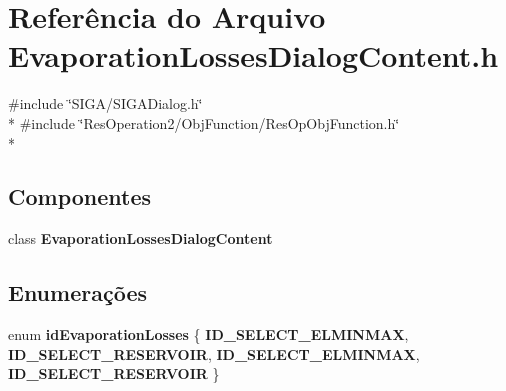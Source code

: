 \section{Referência do Arquivo Evaporation\+Losses\+Dialog\+Content.\+h}
\label{_2_obj_function_2_evaporation_losses_2_evaporation_losses_dialog_content_8h}
{\ttfamily \#include \char`\"{}S\+I\+G\+A/\+S\+I\+G\+A\+Dialog.\+h\char`\"{}}\\*
{\ttfamily \#include \char`\"{}Res\+Operation2/\+Obj\+Function/\+Res\+Op\+Obj\+Function.\+h\char`\"{}}\\*
\subsection*{Componentes}
\begin{DoxyCompactItemize}
\item 
class {\bf Evaporation\+Losses\+Dialog\+Content}
\end{DoxyCompactItemize}
\subsection*{Enumerações}
\begin{DoxyCompactItemize}
\item 
enum {\bf id\+Evaporation\+Losses} \{ {\bf I\+D\+\_\+\+S\+E\+L\+E\+C\+T\+\_\+\+E\+L\+M\+I\+N\+M\+AX}, 
{\bf I\+D\+\_\+\+S\+E\+L\+E\+C\+T\+\_\+\+R\+E\+S\+E\+R\+V\+O\+IR}, 
{\bf I\+D\+\_\+\+S\+E\+L\+E\+C\+T\+\_\+\+E\+L\+M\+I\+N\+M\+AX}, 
{\bf I\+D\+\_\+\+S\+E\+L\+E\+C\+T\+\_\+\+R\+E\+S\+E\+R\+V\+O\+IR}
 \}
\end{DoxyCompactItemize}
